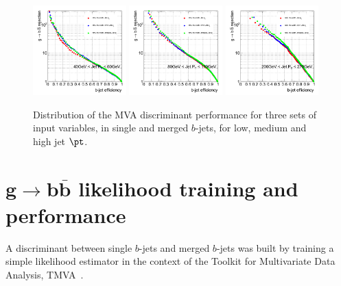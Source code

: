 \begin{figure}[tp]
\centering
\includegraphics[width=0.32\textwidth]{FIGS/TEMPFigs/MVA_differentTrainings/DiffTrainings_RejvsEff40.pdf}
\includegraphics[width=0.32\textwidth]{FIGS/TEMPFigs/MVA_differentTrainings/DiffTrainings_RejvsEff80.pdf}
\includegraphics[width=0.32\textwidth]{FIGS/TEMPFigs/MVA_differentTrainings/DiffTrainings_RejvsEff200.pdf}
\caption{Distribution of the MVA discriminant performance for three sets of input variables, in single and merged $b$-jets, for low, medium and high jet $\pt$.}
\label{fig:outputinbin}
\end{figure}

\section{$\bm{ g\rightarrow b\bar{b}}$ likelihood training and performance}

A discriminant between single $b$-jets and merged $b$-jets was built by training a simple likelihood estimator in the context of the Toolkit for Multivariate Data Analysis, TMVA~\cite{Hocker:2007ht}.

